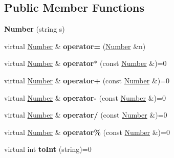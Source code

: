 \subsection*{Public Member Functions}
\begin{DoxyCompactItemize}
\item 
\hypertarget{class_number_a05d50f9922d3734b4247f6a8764106ee}{}{\bfseries Number} (string s)\label{class_number_a05d50f9922d3734b4247f6a8764106ee}

\item 
\hypertarget{class_number_a7b32779e056a0fcc977d9abf734e852b}{}virtual \hyperlink{class_number}{Number} \& {\bfseries operator=} (\hyperlink{class_number}{Number} \&n)\label{class_number_a7b32779e056a0fcc977d9abf734e852b}

\item 
\hypertarget{class_number_a88ef885d6db4ab0931497cf566ea2055}{}virtual \hyperlink{class_number}{Number} \& {\bfseries operator$\ast$} (const \hyperlink{class_number}{Number} \&)=0\label{class_number_a88ef885d6db4ab0931497cf566ea2055}

\item 
\hypertarget{class_number_abd1476aa7036973a13fa66609794a545}{}virtual \hyperlink{class_number}{Number} \& {\bfseries operator+} (const \hyperlink{class_number}{Number} \&)=0\label{class_number_abd1476aa7036973a13fa66609794a545}

\item 
\hypertarget{class_number_ab2abb500d0885ff5d0acfec32a2b442b}{}virtual \hyperlink{class_number}{Number} \& {\bfseries operator-\/} (const \hyperlink{class_number}{Number} \&)=0\label{class_number_ab2abb500d0885ff5d0acfec32a2b442b}

\item 
\hypertarget{class_number_ad656b7aee20b63427d0cddc57a63d252}{}virtual \hyperlink{class_number}{Number} \& {\bfseries operator/} (const \hyperlink{class_number}{Number} \&)=0\label{class_number_ad656b7aee20b63427d0cddc57a63d252}

\item 
\hypertarget{class_number_a975bf8fc41794c952b02d42165a9ae13}{}virtual \hyperlink{class_number}{Number} \& {\bfseries operator\%} (const \hyperlink{class_number}{Number} \&)=0\label{class_number_a975bf8fc41794c952b02d42165a9ae13}

\item 
\hypertarget{class_number_af5397a992de42b055c126e0dddb0ad9e}{}virtual int {\bfseries to\+Int} (string)=0\label{class_number_af5397a992de42b055c126e0dddb0ad9e}


\end{DoxyCompactItemize}
